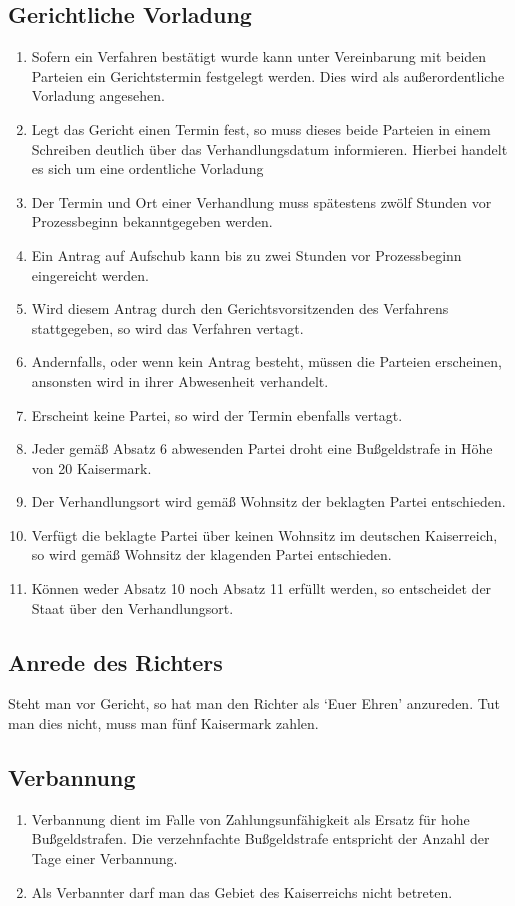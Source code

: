 \documentclass{article}
\begin{document}
\subsection{Gerichtliche Vorladung}
\begin{enumerate}[(1)]
    \item Sofern ein Verfahren bestätigt wurde kann unter Vereinbarung mit beiden Parteien ein Gerichtstermin festgelegt werden. Dies wird als außerordentliche Vorladung angesehen.
    \item Legt das Gericht einen Termin fest, so muss dieses beide Parteien in einem Schreiben deutlich über das Verhandlungsdatum informieren. Hierbei handelt es sich um eine ordentliche Vorladung
    \item Der Termin und Ort einer Verhandlung muss spätestens zwölf Stunden vor Prozessbeginn bekanntgegeben werden.
    \item Ein Antrag auf Aufschub kann bis zu zwei Stunden vor Prozessbeginn eingereicht werden.
    \item Wird diesem Antrag durch den Gerichtsvorsitzenden des Verfahrens stattgegeben, so wird das Verfahren vertagt.
    \item Andernfalls, oder wenn kein Antrag besteht, müssen die Parteien erscheinen, ansonsten wird in ihrer Abwesenheit verhandelt.
    \item Erscheint keine Partei, so wird der Termin ebenfalls vertagt.
    \item Jeder gemäß Absatz 6 abwesenden Partei droht eine Bußgeldstrafe in Höhe von 20 Kaisermark.
    \item Der Verhandlungsort wird gemäß Wohnsitz der beklagten Partei entschieden.
    \item Verfügt die beklagte Partei über keinen Wohnsitz im deutschen Kaiserreich, so wird gemäß Wohnsitz der klagenden Partei entschieden.
    \item Können weder Absatz 10 noch Absatz 11 erfüllt werden, so entscheidet der Staat über den Verhandlungsort.    
\end{enumerate}

\subsection{Anrede des Richters}
Steht man vor Gericht, so hat man den Richter als `Euer Ehren' anzureden. Tut man dies nicht, muss man fünf Kaisermark zahlen.

\subsection{Verbannung}
\begin{enumerate}[(1)]
    \item Verbannung dient im Falle von Zahlungsunfähigkeit als Ersatz für hohe Bußgeldstrafen. Die verzehnfachte Bußgeldstrafe entspricht der Anzahl der Tage einer Verbannung.
    \item Als Verbannter darf man das Gebiet des Kaiserreichs nicht betreten.
\end{enumerate}
\end{document}
